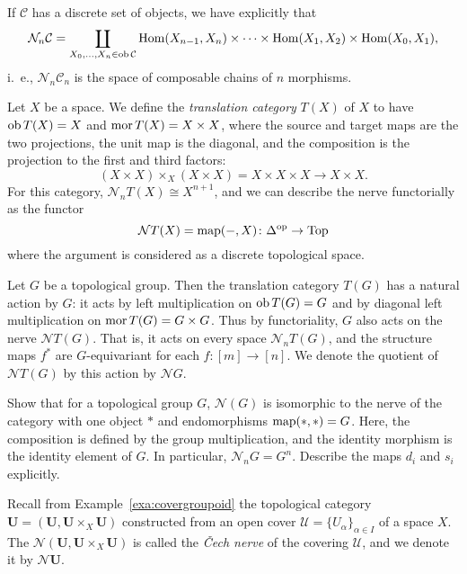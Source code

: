 \documentclass[a4paper,openany]{scrbook}
\renewcommand{\C}{\mathcal C}
\newcommand{\nerve}{\mathcal N}
\begin{document}
If $\C$ has a discrete set of objects, we have explicitly that
\[
\nerve_n\C = \coprod_{X_0,\dots,X_n \in \ob \C} \Hom(X_{n-1},X_n) \times \dots \times \Hom(X_1,X_2) \times \Hom(X_0,X_1),
\]
i.~e., $\nerve_n\C_n$ is the space of composable chains of $n$ morphisms.

\begin{example}\label{ex:translationcat}
Let $X$ be a space. We define the \emph{translation category} $T(X)$ of $X$ to have $\operatorname{ob} T(X) = X$ and $\operatorname{mor} T(X) = X \times X$, where the source and target maps are the two projections, the unit map is the diagonal, and the composition is the projection to the first and third factors:
\[
(X \times X) \times_X (X \times X) = X \times X \times X \to X \times X.
\]
For this category, $\nerve_n T(X) \cong X^{n+1}$, and we can describe the nerve functorially as the functor
\[
\nerve T(X) = \map(-,X)\colon \Delta^\op \to \Top
\]
where the argument is considered as a discrete topological space.
\end{example}

\begin{example}\label{ex:translationcatofgroup}
Let $G$ be a topological group. Then the translation category $T(G)$ has a natural action by $G$: it acts by left multiplication on $\operatorname{ob} T(G) = G$ and by diagonal left multiplication on $\operatorname{mor} T(G) = G \times G$. Thus by functoriality, $G$ also acts on the nerve $\nerve T(G)$. That is, it acts on every space $\nerve_n T(G)$, and the structure maps $f^*$ are $G$-equivariant for each $f\colon [m] \to [n]$. We denote the quotient of $\nerve T(G)$ by this action by $\nerve G$.
\end{example}

\begin{exer}
Show that for a topological group $G$, $\nerve(G)$ is isomorphic to the nerve of the category with one object $*$ and endomorphisms $\operatorname{map}(*,*)=G$. Here, the composition is defined by the group multiplication, and the identity morphism is the identity element of $G$. In particular, $\nerve_nG = G^n$. Describe the maps $d_i$ and $s_i$ explicitly.
\end{exer}

\begin{example}\label{ex:cechnerve}
Recall from Example~\ref{exa:covergroupoid} the topological category $\mathbf U = (\mathbf U,\mathbf U \times_X \mathbf U)$ constructed from an open cover $\mathcal U = \{U_\alpha\}_{\alpha \in I}$ of a space $X$. The $\nerve(\mathbf U,\mathbf U \times_X \mathbf U)$ is called the \emph{\v Cech nerve} of the covering $\mathcal U$, and we denote it by $\nerve\mathbf U$.
\end{example}
\end{document}
